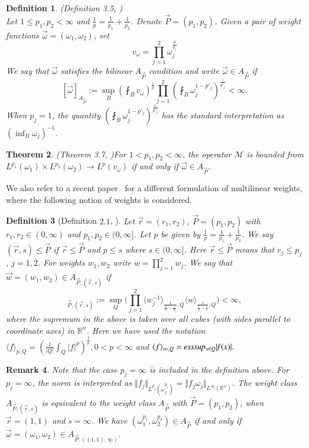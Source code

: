\documentclass[a4paper,12pt]{amsart}
\newtheorem{theorem}{Theorem}[section]
\newtheorem{definition}[theorem]{Definition}
\newtheorem{remark}[theorem]{Remark}
\begin{document}
\begin{definition}(Definition 3.5, \cite{Ler1})  \\ 
Let $1\leq p_{1},p_{2}< \infty $ and $\frac{1}{p}=\frac{1}{p_{1}}+\frac{1}{p_{2}}$. Denote $\vec{P}=(p_{1},p_{2})$.  Given a pair of weight functions      
$\vec{\omega}=(\omega_{1},\omega_{2})$, set $$v_{\omega}=\prod^{2}_{j=1}\omega^{\frac{p}{p_{j}}}_{j}$$
We say that $\vec{\omega}$ satisfies the bilinear $A_{\vec{P}}$ condition and write $\vec{\omega} \in A_{\vec{P}}$ if $$[\vec{\omega}]_{A_{\vec{P}}}:=\sup_{B}\left(\fint_{B}v_{\omega}\right)^{\frac{1}{p}} \prod^{2}_{j=1}\left(\fint_{B}\omega^{1-p'_{j}}_{j}\right)^{\frac{1}{p'_{j}}}<\infty.$$
When $p_{j}=1$, the quantity $\left(\fint_{B}\omega^{1-p'_{j}}_{j}\right)^{\frac{1}{p'_{j}}}$ has the standard interpretation  as $(\inf_{B}\omega_{j})^{-1}$. 
\end{definition}
\begin{theorem}(Theorem 3.7, \cite{Ler1})\label{bmf}
For $1<p_1,p_2<\infty$, the operator $\mathcal M$ is bounded from  $L^{p_{1}}(\omega_{1})\times L^{p_{2}}(\omega_{2})\rightarrow L^{p}(v_{\omega})$ if and only if $\vec{\omega} \in A_{\vec{P}}.$
\end{theorem}
We also refer to a recent paper~\cite{Bas} for a different formulation of multilinear weights, where the following notion of weights is considered. 
\begin{definition}[Definition $2.1$,\cite{Bas} ]
	\label{wNier}
	Let $\vec{r}=(r_1,r_2)$, $\vec{P}=(p_1,p_2)$ with $r_1,r_2\in (0,\infty)$ and $p_1, p_2\in (0,\infty]$. Let $p$ be given by $\frac{1}{p}=\frac{1}{p_1}+\frac{1}{p_2}$. We say $(\vec{r},s)\leq \vec{P}$ if $\vec{r}\leq \vec{P}$ and $p\leq s$ where $s\in (0,\infty]$. Here $\vec{r}\leq \vec{P}$ means that $r_j\leq p_j$, $j=1,2$. For weights $w_1, w_2$ write $w=\prod_{j=1}^2w_j$. We say that $\vec{w}=(w_1,w_2) \in A_{\vec{P},(\vec{r},s)}$ if 
	\begin{equation*}
	[\vec{w}]_{\vec{P},(\vec{r},s)}:=\sup_{Q} \Big(\prod_{j=1}^2 \langle w^{-1}_j\rangle_{\frac{1}{\frac{1}{r_j}-\frac{1}{p_j}}, Q} \langle w\rangle_{\frac{1}{\frac{1}{p}-\frac{1}{s}}, Q}\Big) <\infty,
	\end{equation*}
	where the supremum in the above is taken over all cubes (with sides parallel to coordinate axes) in $\mathbb R^n$. Here we have used the notation  $\langle f\rangle_{p, Q}=\left(\frac{1}{|Q|}\int_Q|f|^p\right)^{\frac{1}{p}}, 0<p<\infty$ and $\langle f\rangle_{\infty, Q}=\it{ess}sup_{x\in Q}|f(x)|.$
\end{definition} 
\begin{remark}
	Note that the case $p_{j}=\infty$ is included in the definition above. For $p_{j}=\infty$, the norm is interpreted as $\Vert f_{j}\Vert_{L^{p_{j}}(\omega^{p_{j}}_{j})}=\Vert f_{j}\omega_{j}\Vert_{L^{\infty}(\mathbb{R}^{n})}$. The weight class $A_{\vec{P},(\vec{r},s)}$ is equivalent to the weight class $A_{\vec{P}}$ with $\vec{P}=(p_{1},p_{2})$, when $\vec{r}=(1,1)$ and $s=\infty$. We have $(\omega^{p_{1}}_{1},\omega^{p_{2}}_{2})\in A_{\vec{P}}$ if and only if $\vec{\omega}=(\omega_{1},\omega_{2})\in A_{\vec{P},((1,1),\infty)}$. 
\end{remark}
\end{document}
